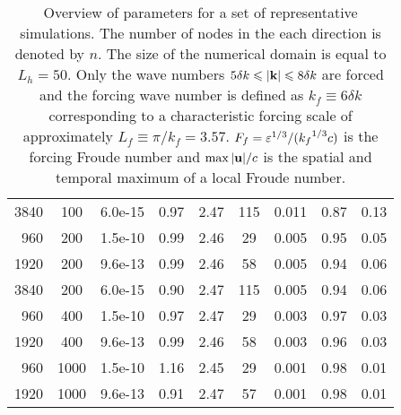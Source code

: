 \begin{table}
\begin{center}
\begin{tabular}{cc@{\hskip 8mm}c@{\hskip 8mm}cccc@{\hskip 8mm}cc}
3840 &  100 & 6.0e-15 & 0.97 & 2.47 & 115 &  0.011 & 0.87 & 0.13 \\[1mm]
~960 &  200 & 1.5e-10 & 0.99 & 2.46 &  29 &  0.005 & 0.95 & 0.05 \\
1920 &  200 & 9.6e-13 & 0.99 & 2.46 &  58 &  0.005 & 0.94 & 0.06 \\
3840 &  200 & 6.0e-15 & 0.90 & 2.47 & 115 &  0.005 & 0.94 & 0.06 \\[1mm]
~960 &  400 & 1.5e-10 & 0.97 & 2.47 &  29 &  0.003 & 0.97 & 0.03 \\
1920 &  400 & 9.6e-13 & 0.99 & 2.46 &  58 &  0.003 & 0.96 & 0.03 \\[1mm]
~960 & 1000 & 1.5e-10 & 1.16 & 2.45 &  29 &  0.001 & 0.98 & 0.01 \\
1920 & 1000 & 9.6e-13 & 0.91 & 2.47 &  57 &  0.001 & 0.98 & 0.01 \\
\end{tabular}
\caption{Overview of parameters for a set of representative simulations. 
The number of nodes in the each direction is denoted by $n$. 
The size of the numerical domain is equal to $L_h = 50$.
Only the wave numbers $5\delta k\leqslant|\textbf{k}|\leqslant8\delta k$ are forced
and the forcing wave number is defined as 
$k_f \equiv 6 \delta k$ 
corresponding to a characteristic forcing scale of approximately 
$L_f \equiv \pi/k_f = 3.57$.
%
$F_f = \varepsilon^{1/3}/({k_f}^{1/3}c)$ is the forcing Froude number and
$\max |\textbf{u}|/c$ is the spatial and temporal maximum of a local Froude
number.  }
\label{tab}
\end{center}
\end{table}



